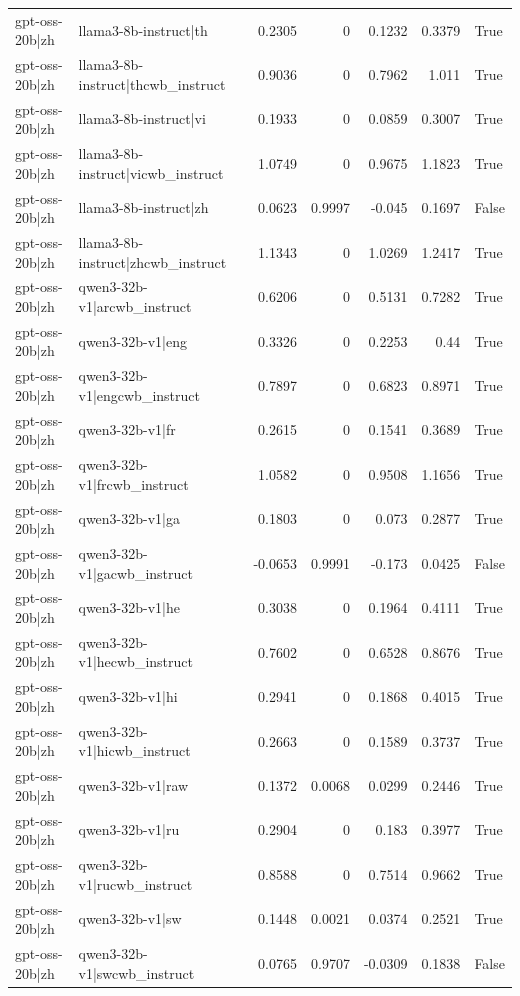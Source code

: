 \begin{table}
\begin{tabular}{l l r r r r l}
gpt-oss-20b|zh & llama3-8b-instruct|th & 0.2305 & 0 & 0.1232 & 0.3379 & True \\
gpt-oss-20b|zh & llama3-8b-instruct|thcwb_instruct & 0.9036 & 0 & 0.7962 & 1.011 & True \\
gpt-oss-20b|zh & llama3-8b-instruct|vi & 0.1933 & 0 & 0.0859 & 0.3007 & True \\
gpt-oss-20b|zh & llama3-8b-instruct|vicwb_instruct & 1.0749 & 0 & 0.9675 & 1.1823 & True \\
gpt-oss-20b|zh & llama3-8b-instruct|zh & 0.0623 & 0.9997 & -0.045 & 0.1697 & False \\
gpt-oss-20b|zh & llama3-8b-instruct|zhcwb_instruct & 1.1343 & 0 & 1.0269 & 1.2417 & True \\
gpt-oss-20b|zh & qwen3-32b-v1|arcwb_instruct & 0.6206 & 0 & 0.5131 & 0.7282 & True \\
gpt-oss-20b|zh & qwen3-32b-v1|eng & 0.3326 & 0 & 0.2253 & 0.44 & True \\
gpt-oss-20b|zh & qwen3-32b-v1|engcwb_instruct & 0.7897 & 0 & 0.6823 & 0.8971 & True \\
gpt-oss-20b|zh & qwen3-32b-v1|fr & 0.2615 & 0 & 0.1541 & 0.3689 & True \\
gpt-oss-20b|zh & qwen3-32b-v1|frcwb_instruct & 1.0582 & 0 & 0.9508 & 1.1656 & True \\
gpt-oss-20b|zh & qwen3-32b-v1|ga & 0.1803 & 0 & 0.073 & 0.2877 & True \\
gpt-oss-20b|zh & qwen3-32b-v1|gacwb_instruct & -0.0653 & 0.9991 & -0.173 & 0.0425 & False \\
gpt-oss-20b|zh & qwen3-32b-v1|he & 0.3038 & 0 & 0.1964 & 0.4111 & True \\
gpt-oss-20b|zh & qwen3-32b-v1|hecwb_instruct & 0.7602 & 0 & 0.6528 & 0.8676 & True \\
gpt-oss-20b|zh & qwen3-32b-v1|hi & 0.2941 & 0 & 0.1868 & 0.4015 & True \\
gpt-oss-20b|zh & qwen3-32b-v1|hicwb_instruct & 0.2663 & 0 & 0.1589 & 0.3737 & True \\
gpt-oss-20b|zh & qwen3-32b-v1|raw & 0.1372 & 0.0068 & 0.0299 & 0.2446 & True \\
gpt-oss-20b|zh & qwen3-32b-v1|ru & 0.2904 & 0 & 0.183 & 0.3977 & True \\
gpt-oss-20b|zh & qwen3-32b-v1|rucwb_instruct & 0.8588 & 0 & 0.7514 & 0.9662 & True \\
gpt-oss-20b|zh & qwen3-32b-v1|sw & 0.1448 & 0.0021 & 0.0374 & 0.2521 & True \\
gpt-oss-20b|zh & qwen3-32b-v1|swcwb_instruct & 0.0765 & 0.9707 & -0.0309 & 0.1838 & False \\

\end{tabular}
\end{table}
